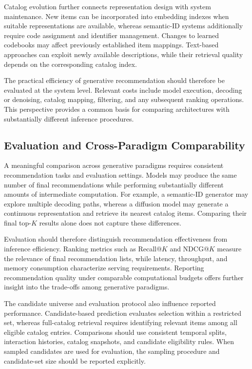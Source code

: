 \documentclass[sigconf,nonacm]{acmart}
\begin{document}
Catalog evolution further connects representation
design with system maintenance. New items can
be incorporated into embedding indexes when
suitable representations are available, whereas
semantic-ID systems additionally require code
assignment and identifier management. Changes
to learned codebooks may affect previously
established item mappings. Text-based approaches
can exploit newly available descriptions, while
their retrieval quality depends on the
corresponding catalog index.

The practical efficiency of generative
recommendation should therefore be evaluated
at the system level. Relevant costs include
model execution, decoding or denoising,
catalog mapping, filtering, and any subsequent
ranking operations. This perspective provides
a common basis for comparing architectures
with substantially different inference procedures.

\subsection{Evaluation and Cross-Paradigm Comparability}

A meaningful comparison across generative
paradigms requires consistent recommendation
tasks and evaluation settings. Models may
produce the same number of final recommendations
while performing substantially different amounts
of intermediate computation. For example, a
semantic-ID generator may explore multiple
decoding paths, whereas a diffusion model may
generate a continuous representation and
retrieve its nearest catalog items. Comparing
their final top-$K$ results alone does not
capture these differences.

Evaluation should therefore distinguish
recommendation effectiveness from inference
efficiency. Ranking metrics such as Recall@$K$
and NDCG@$K$ measure the relevance of final
recommendation lists, while latency, throughput,
and memory consumption characterize serving
requirements. Reporting recommendation quality
under comparable computational budgets offers
further insight into the trade-offs among
generative paradigms.

The candidate universe and evaluation protocol
also influence reported performance. Candidate-based
prediction evaluates selection within a restricted
set, whereas full-catalog retrieval requires
identifying relevant items among all eligible
catalog entries. Comparisons should use consistent
temporal splits, interaction histories, catalog
snapshots, and candidate eligibility rules.
When sampled candidates are used for evaluation,
the sampling procedure and candidate-set size
should be reported explicitly.
\end{document}
